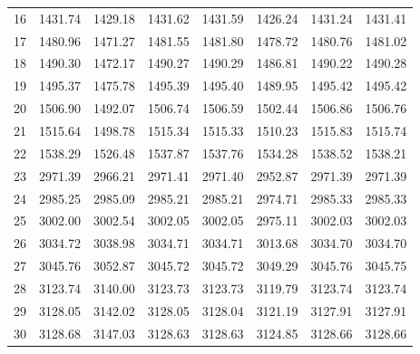 \documentclass[10pt,oneside]{article}
\begin{document}
\begin{table}[h!]
\begin{tabular}{cccccccc}
16 &   1431.74 & 1429.18 & 1431.62 & 1431.59 &      1426.24 & 1431.24 & 1431.41 \\
17 &   1480.96 & 1471.27 & 1481.55 & 1481.80 &      1478.72 & 1480.76 & 1481.02 \\
18 &   1490.30 & 1472.17 & 1490.27 & 1490.29 &      1486.81 & 1490.22 & 1490.28 \\
19 &   1495.37 & 1475.78 & 1495.39 & 1495.40 &      1489.95 & 1495.42 & 1495.42 \\
20 &   1506.90 & 1492.07 & 1506.74 & 1506.59 &      1502.44 & 1506.86 & 1506.76 \\
21 &   1515.64 & 1498.78 & 1515.34 & 1515.33 &      1510.23 & 1515.83 & 1515.74 \\
22 &   1538.29 & 1526.48 & 1537.87 & 1537.76 &      1534.28 & 1538.52 & 1538.21 \\
23 &   2971.39 & 2966.21 & 2971.41 & 2971.40 &      2952.87 & 2971.39 & 2971.39 \\
24 &   2985.25 & 2985.09 & 2985.21 & 2985.21 &      2974.71 & 2985.33 & 2985.33 \\
25 &   3002.00 & 3002.54 & 3002.05 & 3002.05 &      2975.11 & 3002.03 & 3002.03 \\
26 &   3034.72 & 3038.98 & 3034.71 & 3034.71 &      3013.68 & 3034.70 & 3034.70 \\
27 &   3045.76 & 3052.87 & 3045.72 & 3045.72 &      3049.29 & 3045.76 & 3045.75 \\
28 &   3123.74 & 3140.00 & 3123.73 & 3123.73 &      3119.79 & 3123.74 & 3123.74 \\
29 &   3128.05 & 3142.02 & 3128.05 & 3128.04 &      3121.19 & 3127.91 & 3127.91 \\
30 &   3128.68 & 3147.03 & 3128.63 & 3128.63 &      3124.85 & 3128.66 & 3128.66 \\
\bottomrule
\end{tabular}
\end{table}

\clearpage
\end{document}
